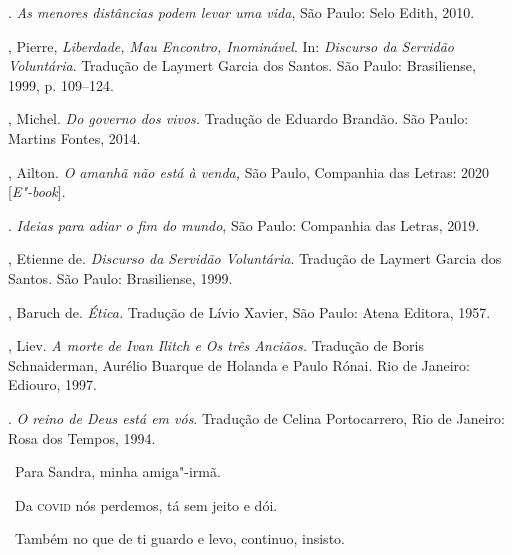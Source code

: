 \begin{bibliohedra}
. \emph{As menores distâncias podem levar uma vida}, São Paulo:
Selo Edith, 2010.

, Pierre, \emph{Liberdade, Mau Encontro, Inominável}. In:
\emph{Discurso da Servidão Voluntária}. Tradução de Laymert Garcia dos
Santos. São Paulo: Brasiliense, 1999, p. 109--124.

, Michel. \emph{Do governo dos vivos.} Tradução de Eduardo
Brandão. São Paulo: Martins Fontes, 2014.

, Ailton. \emph{O amanhã não está à venda,} São Paulo, Companhia
das Letras: 2020 {[}\emph{E"-book}{]}.

\titidem. \emph{Ideias para adiar o fim do mundo}, São Paulo: Companhia
das Letras, 2019.

, Etienne de. \emph{Discurso da Servidão Voluntária}. Tradução
de Laymert Garcia dos Santos. São Paulo: Brasiliense, 1999.

, Baruch de. \emph{Ética.} Tradução de Lívio Xavier, São Paulo:
Atena Editora, 1957.

, Liev. \emph{A morte de Ivan Ilitch e Os três Anciãos.} Tradução
de Boris Schnaiderman, Aurélio Buarque de Holanda e Paulo Rónai. Rio de
Janeiro: Ediouro, 1997.

\titidem. \emph{O reino de Deus está em vós}. Tradução de Celina
Portocarrero, Rio de Janeiro: Rosa dos Tempos, 1994.
\end{bibliohedra}


\hfill\ Para Sandra, minha amiga"-irmã.

\hfill\ Da \textsc{covid} nós perdemos, tá sem jeito e dói.

\hfill\ Também no que de ti guardo e levo, continuo, insisto.

\bigskip

